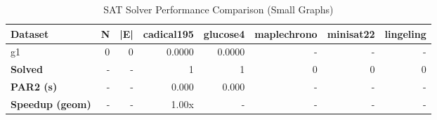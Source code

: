 \begin{table}[htbp]
\centering
\caption{SAT Solver Performance Comparison (Small Graphs)}
\label{tab:table_solvers_small}
\begin{tabular}{lrrrrrrr}
\toprule
Dataset & N & |E| & cadical195 & glucose4 & maplechrono & minisat22 & lingeling \\
\midrule
g1 & 0 & 0 & 0.0000 & 0.0000 & - & - & - \\
\midrule
\textbf{Solved} & - & - & 1 & 1 & 0 & 0 & 0 \\
\textbf{PAR2 (s)} & - & - & 0.000 & 0.000 & - & - & - \\
\textbf{Speedup (geom)} & - & - & 1.00x & - & - & - & - \\
\bottomrule
\end{tabular}
\end{table}
